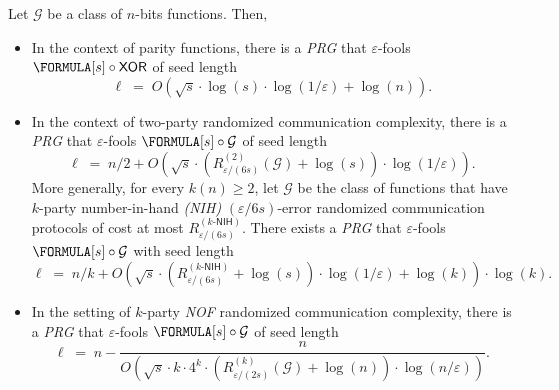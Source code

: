 \setcounter{theorem}{1}
	\begin{theorem} \label{thm:main_PRG}
    	Let $\mathcal{G}$ be a class of $n$-bits functions. Then,
    	\begin{itemize}
            \item[\emph{1.}] In the context of parity functions, there is a \emph{PRG} that $\varepsilon$-fools $\FORMULA[s] \circ \mathsf{XOR}$ of seed length
            $$
                \ell \; = \; O \! \left (\sqrt{s}\cdot\log(s)\cdot\log(1/\varepsilon) + \log(n)\right).
            $$
            
            \item[\emph{2.}] In the context of two-party randomized communication complexity, there is a \emph{PRG} that $\varepsilon$-fools $\FORMULA[s] \circ \mathcal{G}$ of seed length
            $$
                \ell \; = \;  n/2+O \! \left(\sqrt{s}\cdot\left(R^{(2)}_{\varepsilon/(6s)}(\mathcal{G})+\log(s)\right)\cdot\log(1/\varepsilon)\right).
            $$
            More generally, for every $k(n) \geq 2$, let $\mathcal{G}$ be the class of functions that have $k$-party number-in-hand \emph{(NIH)} $(\varepsilon/6s)$-error randomized communication protocols of cost at most $R^{(k\text{-}\mathsf{NIH})}_{\varepsilon/(6s)}$. There exists a \emph{PRG} that $\varepsilon$-fools $\FORMULA[s]\circ \mathcal{G}$ with seed length
            $$
               \ell \; = \; n/k+O \! \left(\sqrt{s}\cdot \left (R^{(k\text{-}\mathsf{NIH})}_{\varepsilon/(6s)} +\log (s) \right )\cdot \log(1/\varepsilon) +\log(k)\right)\cdot\log(k).
            $$
            
            \item[\emph{3.}] In the setting of $k$-party \emph{NOF} randomized communication complexity, there is a \emph{PRG} that $\varepsilon$-fools $\FORMULA[s] \circ \mathcal{G}$ of seed length
            $$
                \ell \; = \; n-\frac{n}{O \! \left(\sqrt{s}\cdot k \cdot 4^k \cdot \left(  R^{(k)}_{\varepsilon/(2s)}(\mathcal{G})+\log(n)\right)\cdot\log(n/\varepsilon)\right)}.
            $$
    	\end{itemize}
	\end{theorem}
